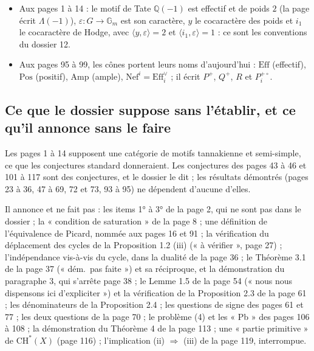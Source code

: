\documentclass[11pt,a4paper]{article}
\begin{document}
\begin{itemize}
  groupes de Chow comme en cohomologie, et ${}^{t}Z_{*}$ l'action de $X$ vers
  $Y$. La page écrit $Z(t)$ et ${}^{t}Z(D)$ sur les cycles, mais
  $a(\gamma(Z))$ en cohomologie dans les deux sens (de $X$ vers $Y$ à la page
  55, de $Y$ vers $X$ à la page 58) ; on normalise.
  \item Aux pages 1 à 14 : le motif de Tate $\mathbb{Q}(-1)$ est effectif et de
  poids $2$ (la page écrit $\Lambda(-1)$), $\varepsilon \colon G \to
  \mathbb{G}_{m}$ est son caractère, $y$ le cocaractère des poids et $i_{1}$ le
  cocaractère de Hodge, avec $\langle y, \varepsilon\rangle = 2$ et $\langle
  i_{1}, \varepsilon\rangle = 1$ : ce sont les conventions du dossier 12.
  \item Aux pages 95 à 99, les cônes portent leurs noms d'aujourd'hui :
  $\mathrm{Eff}$ (effectif), $\mathrm{Pos}$ (positif), $\mathrm{Amp}$ (ample),
  $\mathrm{Nef}^{i} = \mathrm{Eff}_{i}^{\vee}$ ; il écrit $P^{+}$, $Q^{+}$, $R$
  et $P_{i}^{+\circ}$.
\end{itemize}

\subsection*{Ce que le dossier suppose sans l'établir, et ce qu'il annonce sans
le faire}

Les pages 1 à 14 supposent une catégorie de motifs tannakienne et
semi-simple, ce que les conjectures standard donneraient. Les conjectures des
pages 43 à 46 et 101 à 117 sont des conjectures, et le dossier le dit ; les
résultats démontrés (pages 23 à 36, 47 à 69, 72 et 73, 93 à 95) ne dépendent
d'aucune d'elles.

Il annonce et ne fait pas : les items 1° à 3° de la page 2, qui ne sont pas
dans le dossier ; la « condition de saturation » de la page 8 ; une définition
de l'équivalence de Picard, nommée aux pages 16 et 91 ; la vérification du
déplacement des cycles de la Proposition 1.2 (iii) (« à vérifier », page 27) ;
l'indépendance vis-à-vis du cycle, dans la dualité de la page 36 ; le Théorème
3.1 de la page 37 (« dém.\ pas faite ») et sa réciproque, et la démonstration
du paragraphe 3, qui s'arrête page 38 ; le Lemme 1.5 de la page 54 (« nous nous
dispensons ici d'expliciter ») et la vérification de la Proposition 2.3 de la
page 61 ; les dénominateurs de la Proposition 2.4 ; les questions de signe des
pages 61 et 77 ; les deux questions de la page 70 ; le problème (4) et les
« Pb » des pages 106 à 108 ; la démonstration du Théorème 4 de la page 113 ;
une « partie primitive » de $\mathrm{CH}^{*}(X)$ (page 116) ; l'implication
(ii) $\Rightarrow$ (iii) de la page 119, interrompue.
\end{document}
